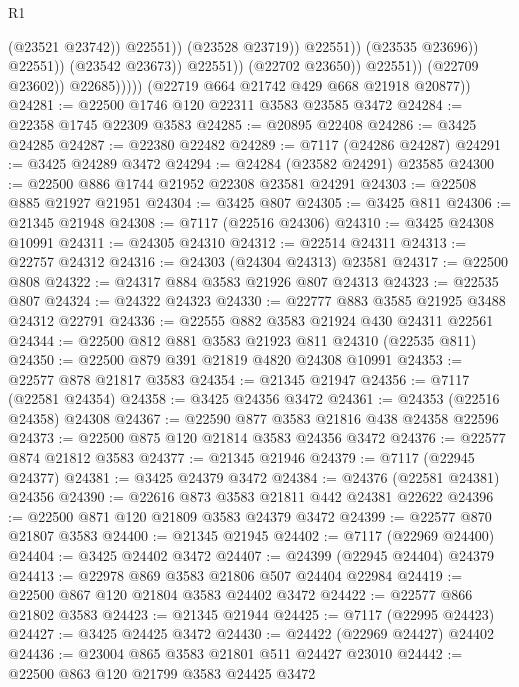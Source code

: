 \begin{lexlean}{R1}
\begin{coremodule}
                                                (@23521 @23742))
                                              @22551))
                                          (@23528 @23719))
                                        @22551))
                                    (@23535 @23696))
                                  @22551))
                              (@23542 @23673))
                            @22551))
                        (@22702 @23650))
                      @22551))
                  (@22709 @23602))
                @22685)))))
      (@22719 @664 @21742 @429 @668 @21918 @20877))
@24281 := @22500 @1746 @120 @22311 @3583 @23585 @3472
@24284 := @22358 @1745 @22309 @3583
@24285 := @20895 @22408
@24286 := @3425 @24285
@24287 := @22380 @22482
@24289 := @7117 (@24286 @24287)
@24291 := @3425 @24289 @3472
@24294 := @24284 (@23582 @24291) @23585
@24300 := @22500 @886 @1744 @21952 @22308 @23581 @24291
@24303 := @22508 @885 @21927 @21951
@24304 := @3425 @807
@24305 := @3425 @811
@24306 := @21345 @21948
@24308 := @7117 (@22516 @24306)
@24310 := @3425 @24308 @10991
@24311 := @24305 @24310
@24312 := @22514 @24311
@24313 := @22757 @24312
@24316 := @24303 (@24304 @24313) @23581
@24317 := @22500 @808
@24322 := @24317 @884 @3583 @21926 @807 @24313
@24323 := @22535 @807
@24324 := @24322 @24323
@24330 := @22777 @883 @3585 @21925 @3488 @24312 @22791
@24336 := @22555 @882 @3583 @21924 @430 @24311 @22561
@24344 := @22500 @812 @881 @3583 @21923 @811 @24310 (@22535 @811)
@24350 := @22500 @879 @391 @21819 @4820 @24308 @10991
@24353 := @22577 @878 @21817 @3583
@24354 := @21345 @21947
@24356 := @7117 (@22581 @24354)
@24358 := @3425 @24356 @3472
@24361 := @24353 (@22516 @24358) @24308
@24367 := @22590 @877 @3583 @21816 @438 @24358 @22596
@24373 := @22500 @875 @120 @21814 @3583 @24356 @3472
@24376 := @22577 @874 @21812 @3583
@24377 := @21345 @21946
@24379 := @7117 (@22945 @24377)
@24381 := @3425 @24379 @3472
@24384 := @24376 (@22581 @24381) @24356
@24390 := @22616 @873 @3583 @21811 @442 @24381 @22622
@24396 := @22500 @871 @120 @21809 @3583 @24379 @3472
@24399 := @22577 @870 @21807 @3583
@24400 := @21345 @21945
@24402 := @7117 (@22969 @24400)
@24404 := @3425 @24402 @3472
@24407 := @24399 (@22945 @24404) @24379
@24413 := @22978 @869 @3583 @21806 @507 @24404 @22984
@24419 := @22500 @867 @120 @21804 @3583 @24402 @3472
@24422 := @22577 @866 @21802 @3583
@24423 := @21345 @21944
@24425 := @7117 (@22995 @24423)
@24427 := @3425 @24425 @3472
@24430 := @24422 (@22969 @24427) @24402
@24436 := @23004 @865 @3583 @21801 @511 @24427 @23010
@24442 := @22500 @863 @120 @21799 @3583 @24425 @3472

\end{coremodule}
\end{lexlean}
